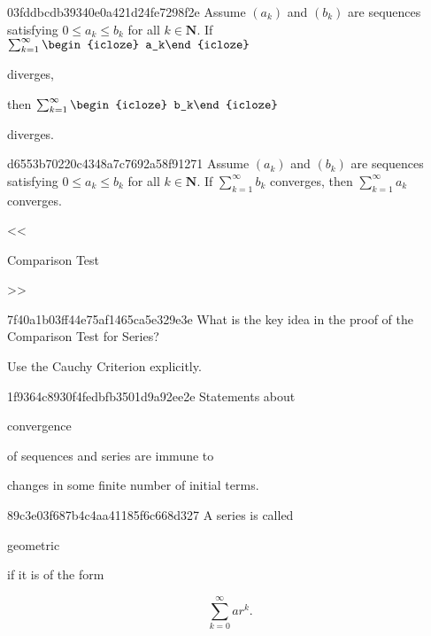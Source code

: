 \begin{note}{03fddbcdb39340e0a421d24fe7298f2e}
    Assume \({ (a_k) }\) and \({ (b_k) }\) are sequences satisfying \({ 0 \leq a_k \leq b_k }\) for all \({ k \in \mathbf{N} }\).
    If \({ \sum_{k=1}^{\infty} \begin{icloze}{1}a_k\end{icloze} }\) \begin{icloze}{2}diverges,\end{icloze} then \({ \sum_{k=1}^{\infty} \begin{icloze}{1}b_k\end{icloze} }\) \begin{icloze}{2}diverges.\end{icloze}
\end{note}

\begin{note}{d6553b70220c4348a7c7692a58f91271}
    Assume \({ (a_k) }\) and \({ (b_k) }\) are sequences satisfying \({ 0 \leq a_k \leq b_k }\) for all \({ k \in \mathbf{N} }\).
    If \({ \sum_{k=1}^{\infty} b_k }\) converges, then \({ \sum_{k=1}^{\infty} a_k }\) converges.

    \begin{center}
        \tiny
        <<\begin{icloze}{1}Comparison Test\end{icloze}>>
    \end{center}
\end{note}

\begin{note}{7f40a1b03ff44e75af1465ca5e329e3e}
    What is the key idea in the proof of the Comparison Test for Series?

    \begin{cloze}{1}
        Use the Cauchy Criterion explicitly.
    \end{cloze}
\end{note}

\begin{note}{1f9364c8930f4fedbfb3501d9a92ee2e}
    Statements about \begin{icloze}{2}convergence\end{icloze} of sequences and series are immune to \begin{icloze}{1}changes in some finite number of initial terms.\end{icloze}
\end{note}

\begin{note}{89c3e03f687b4c4aa41185f6c668d327}
    A series is called \begin{icloze}{2}geometric\end{icloze} if it is of the form
    \begin{icloze}{1}
        \[
            \sum_{k=0}^{\infty} ar^{k}.
        \]
    \end{icloze}
\end{note}

